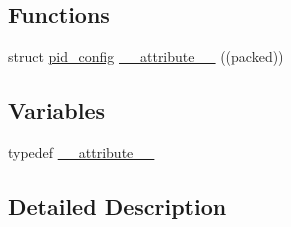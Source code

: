 \subsection*{Functions}
\begin{DoxyCompactItemize}
\item 
struct \hyperlink{structpid__config}{pid\+\_\+config} \hyperlink{group__anglerate_gae8b6172a8a6bf07e60307f41017ea1e9}{\+\_\+\+\_\+attribute\+\_\+\+\_\+} ((packed))
\end{DoxyCompactItemize}
\subsection*{Variables}
\begin{DoxyCompactItemize}
\item 
typedef \hyperlink{group__anglerate_ga2a6188136dddaebe827b03a3a1399ca6}{\+\_\+\+\_\+attribute\+\_\+\+\_\+}
\end{DoxyCompactItemize}


\subsection{Detailed Description}



